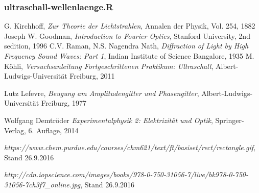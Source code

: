\documentclass[12pt]{article}
\begin{document}
\subsubsection{ultraschall-wellenlaenge.R}\label{ultraschall-wellenlaenge}

\newpage
\listoffigures


\newpage
\thispagestyle{empty}
\begin{thebibliography}{9}

  G. Kirchhoff,
  \emph{Zur Theorie der Lichtstrahlen},
  Annalen der Physik,
  Vol. 254,
  1882
  Joseph W. Goodman,
  \emph{Introduction to Fourier Optics},
  Stanford University,
  2nd sedition,
  1996
  C.V. Raman, N.S. Nagendra Nath,
  \emph{Diffraction of Light by High Frequency Sound Waves: Part 1},
  Indian Institute of Science Bangalore,
  1935
  M. Köhli,
  \emph{Versuchsanleitung Fortgeschrittenen Praktikum: Ultraschall},
  Albert-Ludwigs-Universität Freiburg,
  2011
  
  Lutz Lefevre,
  \emph{Beugung am Amplitudengitter und Phasengitter},
  Albert-Ludwigs-Universität Freiburg,
  1977

Wolfgang Demtröder
 \emph{Experimentalphysik 2: Elektrizität und Optik},
 Springer-Verlag,
 6. Auflage,
 2014
 
 \emph{https://www.chem.purdue.edu/courses/chm621/text/ft/basiset/rect/rectangle.gif}, Stand 26.9.2016
 
 \emph{http://cdn.iopscience.com/images/books/978-0-750-31056-7/live/bk978-0-750-31056-7ch3f7\_online.jpg},
 Stand 26.9.2016
\end{thebibliography}
\end{document}
